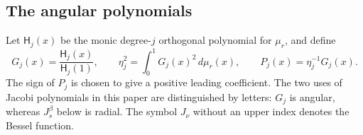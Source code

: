 \subsection{The angular polynomials}

Let $\mathsf H_j(x)$ be the monic degree-$j$ orthogonal polynomial for $\mu_r$,
and define
\begin{equation}\label{inf:angular-normalization}
 G_j(x)=\frac{\mathsf H_j(x)}{\mathsf H_j(1)},\qquad
 \eta_j^2=\int_0^1G_j(x)^2\,d\mu_r(x),\qquad
 P_j(x)=\eta_j^{-1}G_j(x).
\end{equation}
The sign of $P_j$ is chosen to give a positive leading coefficient.
The two uses of Jacobi polynomials in this paper are distinguished by
letters: $G_j$ is angular, whereas $J_s^{\beta}$ below is radial.
The symbol $J_\nu$ without an upper index denotes the Bessel function.

